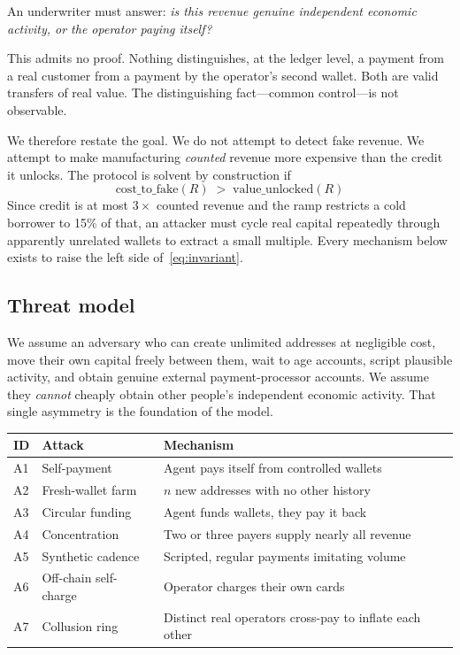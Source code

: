 \documentclass[11pt,a4paper]{article}
\begin{document}
An underwriter must answer: \emph{is this revenue genuine independent economic
activity, or the operator paying itself?}

This admits no proof. Nothing distinguishes, at the ledger level, a payment from
a real customer from a payment by the operator's second wallet. Both are valid
transfers of real value. The distinguishing fact---common control---is not
observable.

We therefore restate the goal. We do not attempt to detect fake revenue. We
attempt to make manufacturing \emph{counted} revenue more expensive than the
credit it unlocks. The protocol is solvent by construction if
\begin{equation}
\mathrm{cost\_to\_fake}(R) \;>\; \mathrm{value\_unlocked}(R)
\label{eq:invariant}
\end{equation}
Since credit is at most $3\times$ counted revenue and the ramp restricts a cold
borrower to 15\% of that, an attacker must cycle real capital repeatedly through
apparently unrelated wallets to extract a small multiple. Every mechanism below
exists to raise the left side of~\eqref{eq:invariant}.

\subsection{Threat model}

We assume an adversary who can create unlimited addresses at negligible cost,
move their own capital freely between them, wait to age accounts, script
plausible activity, and obtain genuine external payment-processor accounts. We
assume they \emph{cannot} cheaply obtain other people's independent economic
activity. That single asymmetry is the foundation of the model.

\begin{center}
\begin{tabular}{@{}llp{7.6cm}@{}}
\toprule
\textbf{ID} & \textbf{Attack} & \textbf{Mechanism} \\
\midrule
A1 & Self-payment      & Agent pays itself from controlled wallets \\
A2 & Fresh-wallet farm & $n$ new addresses with no other history \\
A3 & Circular funding  & Agent funds wallets, they pay it back \\
A4 & Concentration     & Two or three payers supply nearly all revenue \\
A5 & Synthetic cadence & Scripted, regular payments imitating volume \\
A6 & Off-chain self-charge & Operator charges their own cards \\
A7 & Collusion ring    & Distinct real operators cross-pay to inflate each other \\
\bottomrule
\end{tabular}
\end{center}
\end{document}
